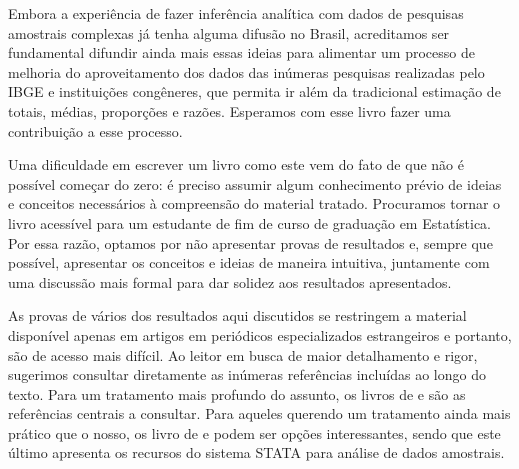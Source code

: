 \documentclass[
]{book}
\begin{document}
Embora a experiência de fazer inferência analítica com dados de pesquisas amostrais complexas já tenha alguma difusão no Brasil, acreditamos ser fundamental difundir ainda mais essas ideias para alimentar um processo de melhoria do aproveitamento dos dados das inúmeras pesquisas realizadas pelo IBGE e instituições congêneres, que permita ir além da tradicional estimação de totais, médias, proporções e razões. Esperamos com esse livro fazer uma contribuição a esse processo.

Uma dificuldade em escrever um livro como este vem do fato de que não é possível começar do zero: é preciso assumir algum conhecimento prévio de ideias e conceitos necessários à compreensão do material tratado. Procuramos tornar o livro acessível para um estudante de fim de curso de graduação em Estatística. Por essa razão, optamos por não apresentar provas de resultados e, sempre que possível, apresentar os conceitos e ideias de maneira intuitiva, juntamente com uma discussão mais formal para dar solidez aos resultados apresentados.

As provas de vários dos resultados aqui discutidos se restringem a material disponível apenas em artigos em periódicos especializados estrangeiros e portanto, são de acesso mais difícil. Ao leitor em busca de maior detalhamento e rigor, sugerimos consultar diretamente as inúmeras referências incluídas ao longo do texto. Para um tratamento mais profundo do assunto, os livros de \citep{SHS89} e \citep{CHSK2003} são as referências centrais a consultar. Para aqueles querendo um tratamento ainda mais prático que o nosso, os livro de \citep{lethonen} e \citep{heeringa} podem ser opções interessantes, sendo que este último apresenta os recursos do sistema STATA para análise de dados amostrais.

  
\end{document}
